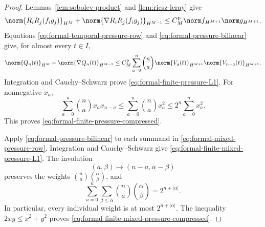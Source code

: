 \begin{proof}
Lemmas~\ref{lem:sobolev-product} and \ref{lem:riesz-leray} give
\begin{equation}
 \norm{R_iR_j(f_i g_j)}_{H^M}
 +\norm{\nabla R_iR_j(f_i g_j)}_{H^{M-1}}
 \le C_M^{\rm p}\norm f_{H^{M+1}}\norm g_{H^{M+1}}.
 \label{eq:formal-pressure-bilinear}
\end{equation}
Equations \eqref{eq:formal-temporal-pressure-row} and
\eqref{eq:formal-pressure-bilinear} give, for almost every \(t\in I\),
\[
 \norm{Q_n(t)}_{H^M}
 +\norm{\nabla Q_n(t)}_{H^{M-1}}
 \le
 C_M^{\rm p}\sum_{a=0}^{n}\binom na
 \norm{V_a(t)}_{H^{M+1}}
 \norm{V_{n-a}(t)}_{H^{M+1}}.
\]
Integration and Cauchy--Schwarz prove
\eqref{eq:formal-finite-pressure-L1}.  For nonnegative \(x_a\),
\[
 \sum_{a=0}^{n}\binom nax_ax_{n-a}
 \le
 \sum_{a=0}^{n}\binom nax_a^2
 \le
 2^n\sum_{a=0}^{n}x_a^2.
\]
This proves \eqref{eq:formal-finite-pressure-compressed}.

Apply \eqref{eq:formal-pressure-bilinear} to each summand in
\eqref{eq:formal-mixed-pressure-row}.  Integration and Cauchy--Schwarz give
\eqref{eq:formal-finite-mixed-pressure-L1}.  The involution
\[
 (a,\beta)\longmapsto(n-a,\alpha-\beta)
\]
preserves the weights
\(\binom na\binom{\alpha}{\beta}\), and
\[
 \sum_{a=0}^{n}\sum_{\beta\le\alpha}
 \binom na\binom{\alpha}{\beta}
 =2^{n+|\alpha|}.
\]
In particular, every individual weight is at most \(2^{n+|\alpha|}\).
The inequality \(2xy\le x^2+y^2\) proves
\eqref{eq:formal-finite-mixed-pressure-compressed}.
\end{proof}
